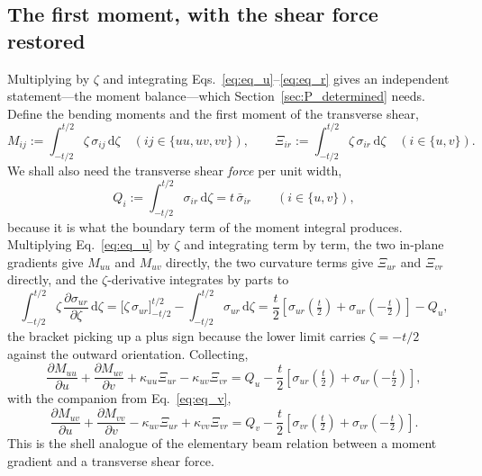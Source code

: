 \documentclass[11pt]{article}
\begin{document}
\subsection{The first moment, with the shear force restored}\label{sec:first_moment}
Multiplying by $\zeta$ and integrating Eqs.~\eqref{eq:eq_u}--\eqref{eq:eq_r} gives an independent statement---the moment balance---which
Section~\ref{sec:P_determined} needs. Define the bending moments and the first
moment of the transverse shear,
\begin{equation}\label{eq:M_Xi_def}
    M_{ij} := \int_{-t/2}^{t/2} \zeta\,\sigma_{ij}\,\mathrm d\zeta
      \quad \left(ij \in \{uu, uv, vv\}\right),
    \qquad
    \Xi_{ir} := \int_{-t/2}^{t/2} \zeta\,\sigma_{ir}\,\mathrm d\zeta
      \quad \left(i \in \{u, v\}\right).
\end{equation}
We shall also need the transverse shear \emph{force} per unit width,
\begin{equation}\label{eq:Q_def}
    Q_{i} := \int_{-t/2}^{t/2}\sigma_{ir}\,\mathrm d\zeta
      = t\,\bar\sigma_{ir}
    \qquad \left(i \in \{u,v\}\right),
\end{equation}
because it is what the boundary term of the moment integral produces. Multiplying
Eq.~\eqref{eq:eq_u} by $\zeta$ and integrating term by term, the two in-plane
gradients give $M_{uu}$ and $M_{uv}$ directly, the two curvature terms give
$\Xi_{ur}$ and $\Xi_{vr}$ directly, and the $\zeta$-derivative integrates by
parts to
\begin{equation}\label{eq:zeta_moment_raw}
    \int_{-t/2}^{t/2}\zeta\,\frac{\partial \sigma_{ur}}{\partial \zeta}\,
      \mathrm d\zeta
    = \Big[\zeta\,\sigma_{ur}\Big]_{-t/2}^{t/2}
      - \int_{-t/2}^{t/2}\sigma_{ur}\,\mathrm d\zeta
    = \frac{t}{2}\left[\sigma_{ur}\!\left(\tfrac{t}{2}\right)
      + \sigma_{ur}\!\left(-\tfrac{t}{2}\right)\right] - Q_u ,
\end{equation}
the bracket picking up a plus sign because the lower limit carries
$\zeta = -t/2$ against the outward orientation. Collecting,
\begin{equation}\label{eq:moment_u}
    \boxed{\;\frac{\partial M_{uu}}{\partial u}
      + \frac{\partial M_{uv}}{\partial v}
      + \kappa_{uu}\Xi_{ur} - \kappa_{uv}\Xi_{vr}
    = Q_u - \frac{t}{2}\left[\sigma_{ur}\!\left(\tfrac{t}{2}\right)
      + \sigma_{ur}\!\left(-\tfrac{t}{2}\right)\right],\;}
\end{equation}
with the companion from Eq.~\eqref{eq:eq_v},
\begin{equation}\label{eq:moment_v}
    \boxed{\;\frac{\partial M_{uv}}{\partial u}
      + \frac{\partial M_{vv}}{\partial v}
      - \kappa_{uv}\Xi_{ur} + \kappa_{vv}\Xi_{vr}
    = Q_v - \frac{t}{2}\left[\sigma_{vr}\!\left(\tfrac{t}{2}\right)
      + \sigma_{vr}\!\left(-\tfrac{t}{2}\right)\right].\;}
\end{equation}
This is the shell analogue of the elementary beam relation between a moment
gradient and a transverse shear force.
\end{document}

